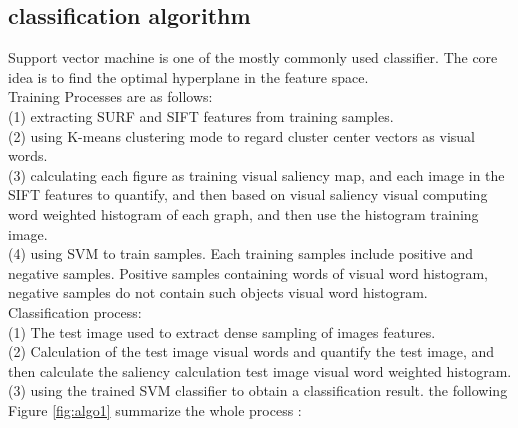 \subsection{classification algorithm }
 Support vector machine is one of the mostly
commonly used classiﬁer. The core idea is to ﬁnd the optimal
hyperplane in the feature space.\\
Training Processes are as follows:\\ (1) extracting SURF
and SIFT features from training samples.\\ (2) using K-means
clustering mode to regard cluster center vectors as visual
words.\\ (3) calculating each ﬁgure as training visual saliency
map, and each image in the SIFT features to quantify, and
then based on visual saliency visual computing word weighted
histogram of each graph, and then use the histogram training
image.\\ (4) using SVM to train samples. Each training samples
include positive and negative samples. Positive samples containing
words of visual word histogram, negative samples do
not contain such objects visual word histogram.\\ Classiﬁcation
process:\\ (1) The test image used to extract dense sampling of
images features. \\(2) Calculation of the test image visual words
and quantify the test image, and then calculate the saliency
calculation test image visual word weighted histogram.\\ (3)
using the trained SVM classiﬁer to obtain a classiﬁcation
result.
the following Figure \ref{fig:algo1}  summarize the whole  process :

